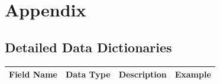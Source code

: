 \documentclass{article}
\begin{document}
\printglossary

\section{Appendix}

\subsection{Detailed Data Dictionaries}

\begin{center}
\begin{longtable}{|p{3cm}|p{2cm}|p{5cm}|p{3cm}|}

\hline
\textbf{Field Name} & \textbf{Data Type} & \textbf{Description}  & \textbf{Example}\\
\hline
\endhead


\end{longtable}
\end{center}
\end{document}
